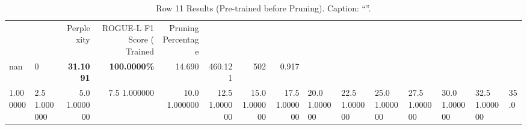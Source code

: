 \begin{table}
\caption{Row 11 Results (Pre-trained before Pruning). \ifshowcaption{}Caption: ``''.\fi}
\label{tab:evaluation-pipeline-11-trained}
\begin{tabular}{llrrrrrr}
 &  & Perplexity & ROGUE-L F1 Score (%
Trained & Pruning Percentage &  &  &  &  &  &  \\
nan & 0 & \bfseries 31.1091 & \bfseries 100.0000\% & 14.690 & 460.121 & 502 & 0.917 \\
1.000000 & 2.5%
1.000000 & 5.0%
1.000000 & 7.5%
1.000000 & 10.0%
1.000000 & 12.5%
1.000000 & 15.0%
1.000000 & 17.5%
1.000000 & 20.0%
1.000000 & 22.5%
1.000000 & 25.0%
1.000000 & 27.5%
1.000000 & 30.0%
1.000000 & 32.5%
1.000000 & 35.0%

\end{tabular}
\end{table}
